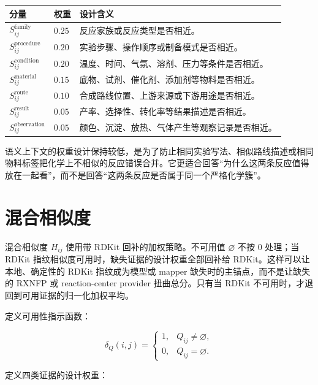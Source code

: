 \documentclass[11pt]{article}
\numberwithin{equation}{section}
\begin{document}
\begin{center}
\begin{tabularx}{\textwidth}{@{}llX@{}}
\toprule
分量 & 权重 & 设计含义 \\
\midrule
\(S^{\mathrm{family}}_{ij}\) & \(0.25\) & 反应家族或反应类型是否相近。 \\
\(S^{\mathrm{procedure}}_{ij}\) & \(0.20\) & 实验步骤、操作顺序或制备模式是否相近。 \\
\(S^{\mathrm{condition}}_{ij}\) & \(0.20\) & 温度、时间、气氛、溶剂、压力等条件是否相近。 \\
\(S^{\mathrm{material}}_{ij}\) & \(0.15\) & 底物、试剂、催化剂、添加剂等物料是否相近。 \\
\(S^{\mathrm{route}}_{ij}\) & \(0.10\) & 合成路线位置、上游来源或下游用途是否相近。 \\
\(S^{\mathrm{result}}_{ij}\) & \(0.05\) & 产率、选择性、转化率等结果描述是否相近。 \\
\(S^{\mathrm{observation}}_{ij}\) & \(0.05\) & 颜色、沉淀、放热、气体产生等观察记录是否相近。 \\
\bottomrule
\end{tabularx}
\end{center}

语义上下文的权重设计保持较低，是为了防止相同实验写法、相似路线描述或相同物料标签把化学上不相似的反应错误合并。它更适合回答“为什么这两条反应值得放在一起看”，而不是回答“这两条反应是否属于同一个严格化学簇”。

\section{混合相似度}

混合相似度 \(H_{ij}\) 使用带 RDKit 回补的加权策略。不可用值 \(\varnothing\) 不按 \(0\) 处理；当 RDKit 指纹相似度可用时，缺失证据的设计权重全部回补给 RDKit。这样可以让本地、确定性的 RDKit 指纹成为模型或 mapper 缺失时的主锚点，而不是让缺失的 RXNFP 或 reaction-center provider 扭曲总分。只有当 RDKit 不可用时，才退回到可用证据的归一化加权平均。

定义可用性指示函数：

\begin{equation}
\delta_Q(i,j)
=
\begin{cases}
1, & Q_{ij}\neq\varnothing, \\
0, & Q_{ij}=\varnothing.
\end{cases}
\end{equation}

定义四类证据的设计权重：
\end{document}
